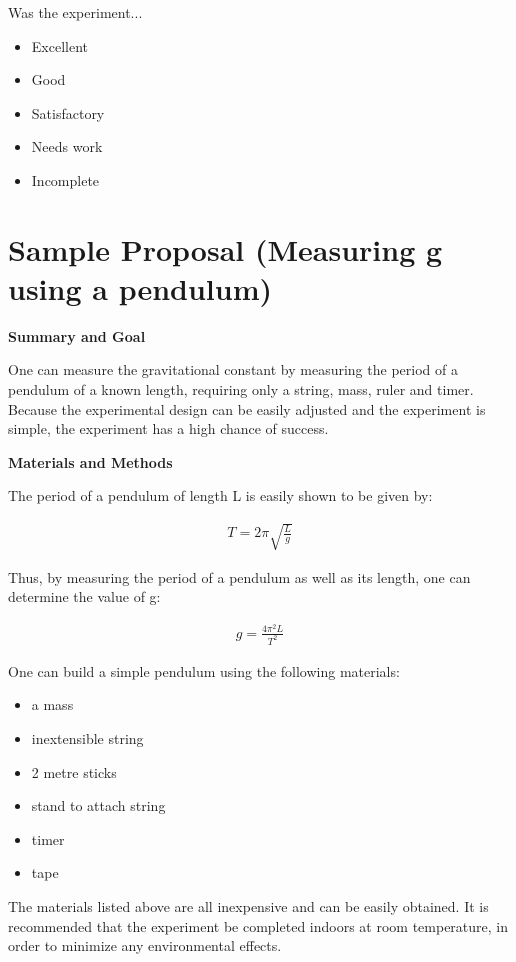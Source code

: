 Was the experiment...
\begin{itemize}
\item Excellent
\item Good
\item Satisfactory
\item Needs work
\item Incomplete
\end{itemize}

\newpage
\section{Sample Proposal (Measuring g using a pendulum)}
 \vspace{0.25cm}
\textbf{Summary and Goal}

One can measure the gravitational constant by measuring the period of a pendulum of a known length, requiring only a string, mass, ruler and timer. Because the experimental design can be easily adjusted and the experiment is simple, the experiment has a high chance of success.

\textbf{Materials and Methods}

The period of a pendulum of length L is easily shown to be given by:

\begin{align*}
T=2\pi \sqrt {\frac{L}{g}}
\end{align*}

Thus, by measuring the period of a pendulum as well as its length, one can determine the value of g:

\begin{align*}
g=\frac{4\pi^{2}L}{T^{2}}
\end{align*}

One can build a simple pendulum using the following materials:
\begin{itemize}
\item a mass
\item inextensible string
\item 2 metre sticks
\item stand to attach string
\item timer
\item tape
\end{itemize}

The materials listed above are all inexpensive and can be easily obtained.  It is recommended that the experiment be completed indoors at room temperature, in order to minimize any environmental effects. 

